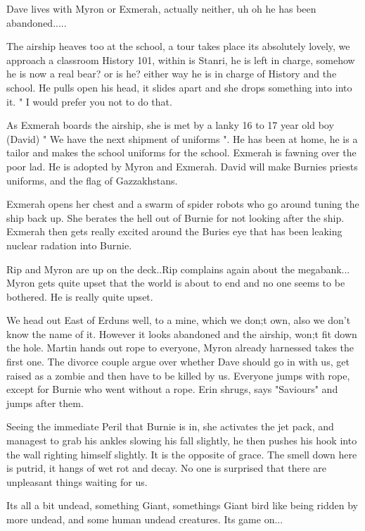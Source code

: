 Dave lives with Myron or Exmerah, actually neither, uh oh he has been abandoned.....\medskip

The airship heaves too at the school, a tour takes place its absolutely lovely, we approach a classroom History 101, within is Stanri, he is left in charge, somehow he is now a real bear? or is he? either way he is in charge of History and the school. He pulls open his head, it slides apart and she drops something into into it. " I would prefer you not to do that.\medskip

As Exmerah boards the airship, she is met by a lanky 16 to 17 year old boy (David) " We have the next shipment of uniforms ". He has been at home, he is a tailor and makes the school uniforms for the school. Exmerah is fawning over the poor lad. He is adopted by Myron and Exmerah. David will make Burnies priests uniforms, and the flag of Gazzakhstans.\medskip

Exmerah opens her chest and a swarm of spider robots who go around tuning the ship back up. She berates the hell out of Burnie for not looking after the ship. Exmerah then gets really excited around the Buries eye that has been leaking nuclear radation into Burnie.\medskip

Rip and Myron are up on the deck..Rip complains again about the megabank... Myron gets quite upset that the world is about to end and no one seems to be bothered. He is really quite upset.\medskip

We head out East of Erduns well, to a mine, which we don;t own, also we don't know the name of it. However it looks abandoned and the airship, won;t fit down the hole. Martin hands out rope to everyone, Myron already harnessed takes the first one. The divorce couple argue over whether Dave should go in with us, get raised as a zombie and then have to be killed by us. Everyone jumps with rope, except for Burnie who went without a rope. Erin shrugs, says "Saviours" and jumps after them.\medskip

Seeing the immediate Peril that Burnie is in, she activates the jet pack, and managest to grab his ankles slowing his fall slightly, he then pushes his hook into the wall righting himself slightly. It is the opposite of grace. The smell down here is putrid, it hangs of wet rot and decay. No one is surprised that there are unpleasant things waiting for us.\medskip

Its all a bit undead, something Giant, somethings Giant bird like being ridden by more undead, and some human undead creatures. Its game on...\medskip

